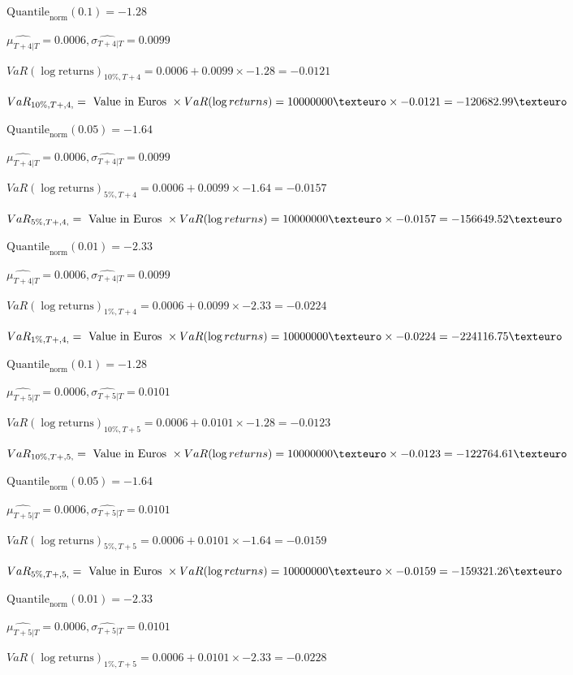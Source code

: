 $\text{Quantile}_\text{norm}(0.1) = -1.28$

$\hat{\mu_{T+4|T}} = 0.0006, \hat{\sigma_{T+4|T}} = 0.0099$

$VaR(\log \text{returns})_{10\%, T + 4} = 0.0006 + 0.0099\times-1.28 = -0.0121$

$VaR_{10\%, T + ,4,} = \text{ Value in Euros } \times VaR(\log returns) = 10 000 000 \texteuro \times-0.0121 = -120682.99 \texteuro$


$\text{Quantile}_\text{norm}(0.05) = -1.64$

$\hat{\mu_{T+4|T}} = 0.0006, \hat{\sigma_{T+4|T}} = 0.0099$

$VaR(\log \text{returns})_{5\%, T + 4} = 0.0006 + 0.0099\times-1.64 = -0.0157$

$VaR_{5\%, T + ,4,} = \text{ Value in Euros } \times VaR(\log returns) = 10 000 000 \texteuro \times-0.0157 = -156649.52 \texteuro$


$\text{Quantile}_\text{norm}(0.01) = -2.33$

$\hat{\mu_{T+4|T}} = 0.0006, \hat{\sigma_{T+4|T}} = 0.0099$

$VaR(\log \text{returns})_{1\%, T + 4} = 0.0006 + 0.0099\times-2.33 = -0.0224$

$VaR_{1\%, T + ,4,} = \text{ Value in Euros } \times VaR(\log returns) = 10 000 000 \texteuro \times-0.0224 = -224116.75 \texteuro$


$\text{Quantile}_\text{norm}(0.1) = -1.28$

$\hat{\mu_{T+5|T}} = 0.0006, \hat{\sigma_{T+5|T}} = 0.0101$

$VaR(\log \text{returns})_{10\%, T + 5} = 0.0006 + 0.0101\times-1.28 = -0.0123$

$VaR_{10\%, T + ,5,} = \text{ Value in Euros } \times VaR(\log returns) = 10 000 000 \texteuro \times-0.0123 = -122764.61 \texteuro$


$\text{Quantile}_\text{norm}(0.05) = -1.64$

$\hat{\mu_{T+5|T}} = 0.0006, \hat{\sigma_{T+5|T}} = 0.0101$

$VaR(\log \text{returns})_{5\%, T + 5} = 0.0006 + 0.0101\times-1.64 = -0.0159$

$VaR_{5\%, T + ,5,} = \text{ Value in Euros } \times VaR(\log returns) = 10 000 000 \texteuro \times-0.0159 = -159321.26 \texteuro$


$\text{Quantile}_\text{norm}(0.01) = -2.33$

$\hat{\mu_{T+5|T}} = 0.0006, \hat{\sigma_{T+5|T}} = 0.0101$

$VaR(\log \text{returns})_{1\%, T + 5} = 0.0006 + 0.0101\times-2.33 = -0.0228$

